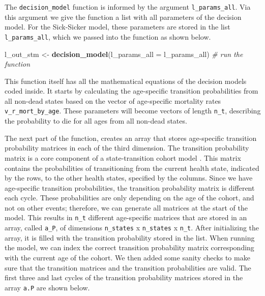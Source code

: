 \documentclass[]{book}
\newenvironment{Shaded}{\begin{snugshade}}{\end{snugshade}}
\newcommand{\CommentTok}[1]{\textcolor[rgb]{0.56,0.35,0.01}{\textit{#1}}}
\newcommand{\DataTypeTok}[1]{\textcolor[rgb]{0.13,0.29,0.53}{#1}}
\newcommand{\KeywordTok}[1]{\textcolor[rgb]{0.13,0.29,0.53}{\textbf{#1}}}
\newcommand{\NormalTok}[1]{#1}
\newcommand{\StringTok}[1]{\textcolor[rgb]{0.31,0.60,0.02}{#1}}
\begin{document}
The \texttt{decision\_model} function is informed by the argument \texttt{l\_params\_all}. Via this argument we give the function a list with all parameters of the decision model. For the Sick-Sicker model, these parameters are stored in the list \texttt{l\_params\_all}, which we passed into the function as shown below.

\begin{Shaded}
\begin{Highlighting}[]
\NormalTok{l_out_stm <-}\StringTok{ }\KeywordTok{decision_model}\NormalTok{(}\DataTypeTok{l_params_all =}\NormalTok{ l_params_all) }\CommentTok{# run the function}
\end{Highlighting}
\end{Shaded}

This function itself has all the mathematical equations of the decision models coded inside. It starts by calculating the age-specific transition probabilities from all non-dead states based on the vector of age-specific mortality rates \texttt{v\_r\_mort\_by\_age}. These parameters will become vectors of length \texttt{n\_t}, describing the probability to die for all ages from all non-dead states.

The next part of the function, creates an array that stores age-specific transition probability matrices in each of the third dimension. The transition probability matrix is a core component of a state-transition cohort model \citep{Iskandar2018}. This matrix contains the probabilities of transitioning from the current health state, indicated by the rows, to the other health states, specified by the columns. Since we have age-specific transition probabilities, the transition probability matrix is different each cycle. These probabilities are only depending on the age of the cohort, and not on other events; therefore, we can generate all matrices at the start of the model. This results in \texttt{n\_t} different age-specific matrices that are stored in an array, called \texttt{a\_P}, of dimensions \texttt{n\_states} x \texttt{n\_states} x \texttt{n\_t}. After initializing the array, it is filled with the transition probability stored in the list. When running the model, we can index the correct transition probability matrix corresponding with the current age of the cohort. We then added some sanity checks to make sure that the transition matrices and the transition probabilities are valid. The first three and last cycles of the transition probability matrices stored in the array \texttt{a.P} are shown below.
\end{document}

